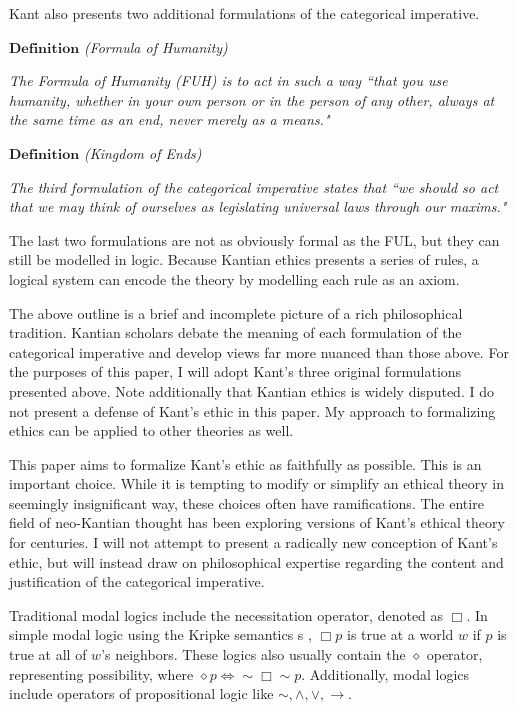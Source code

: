 \begin{isabellebody}
\begin{isamarkuptext}
Kant also presents two additional formulations of the categorical imperative. 

$\textbf{Definition}$ \emph{(Formula of Humanity)}

\emph{The Formula of Humanity (FUH)
is to act in such a way ``that you use humanity, whether in your own person or in the person
of any other, always at the same time as an end, never merely as a means."}\cite{groundwork}

\medskip 

$\textbf{Definition}$ \emph{(Kingdom of Ends)}

\emph{The third formulation of the categorical imperative states that ``we should so act that we may 
think of ourselves as legislating universal laws through our maxims."}\cite{KorsgaardFUL}

The last two formulations are not as obviously formal as the FUL, but they can still be
modelled in logic. Because Kantian ethics presents a series of rules, a logical system can encode 
the theory by modelling each rule as an axiom.

The above outline is a brief and incomplete picture of a rich philosophical tradition. Kantian scholars
debate the meaning of each formulation of the categorical imperative and develop views far more 
nuanced than those above. For the purposes of this paper, I will adopt Kant's three original 
formulations presented above. Note additionally that Kantian ethics is widely disputed. I do not present 
a defense of Kant's ethic in this paper. My approach to formalizing ethics can be applied to other 
theories as well.  

This paper aims to formalize Kant's ethic as faithfully as possible. This is an important choice. 
While it is tempting to modify or simplify an ethical theory in seemingly insignificant way, these 
choices often have ramifications. The entire field of neo-Kantian thought 
has been exploring versions of Kant's ethical theory for centuries. I will not attempt to present a 
radically new conception of Kant's ethic, but will instead draw on philosophical expertise regarding
the content and justification of the categorical imperative.%
\end{isamarkuptext}\isamarkuptrue%
%
\isadelimdocument
%
\endisadelimdocument
%
\isatagdocument
%
\isamarkuptrue%
%
\isamarkuptrue%
%
\endisatagdocument
{\isafolddocument}%
%
\isadelimdocument
%
\endisadelimdocument
%
\begin{isamarkuptext}%
Traditional modal logics include the necessitation operator, denoted as $\Box$. In simple modal logic
using the Kripke semantics s \cite{cresswell}, $\Box p$ is true at a world $w$ if $p$ is true at all of $w$'s neighbors. 
These logics also usually contain the $\diamond$ operator, representing possibility, where
 $\diamond p \iff \sim \Box \sim p$. Additionally, modal logics include operators of propositional 
logic like $\sim, \wedge, \vee, \rightarrow$.


\end{isamarkuptext}
\end{isabellebody}
